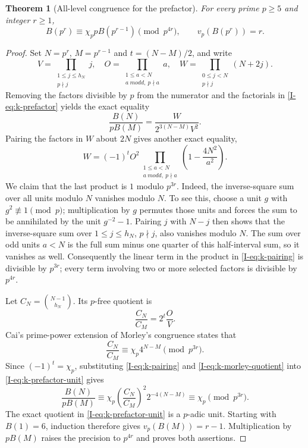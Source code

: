 \documentclass[11pt,letterpaper]{article}
\newtheorem{theorem}{Theorem}[section]
\numberwithin{equation}{section}
\begin{document}
\begin{theorem}[All-level congruence for the prefactor]
\label{I-thm:k-prefactor}
For every prime $p\ge5$ and integer $r\ge1$,
\begin{equation}\label{I-eq:k-prefactor-congruence}
 B(p^r)\equiv\chi_p pB(p^{r-1})\pmod{p^{4r}},
 \qquad v_p(B(p^r))=r.
\end{equation}
\end{theorem}
\begin{proof}
Set $N=p^r$, $M=p^{r-1}$ and $t=(N-M)/2$, and write
\[
 V=\prod_{\substack{1\le j\le h_N\\p\nmid j}}j,
 \quad O=\prod_{\substack{1\le a<N\\a\ modd,\ p\nmid a}}a,
 \quad W=\prod_{\substack{0\le j<N\\p\nmid j}}(N+2j).
\]
Removing the factors divisible by $p$ from the numerator and the
factorials in \eqref{I-eq:k-prefactor} yields the exact equality
\begin{equation}\label{I-eq:k-prefactor-unit}
 \frac{B(N)}{pB(M)}=\frac{W}{2^{3(N-M)}V^2}.
\end{equation}
Pairing the factors in $W$ about $2N$ gives another exact equality,
\begin{equation}\label{I-eq:k-pairing}
 W=(-1)^t O^2
 \prod_{\substack{1\le a<N\\a\ modd,\ p\nmid a}}
       \left(1-\frac{4N^2}{a^2}\right).
\end{equation}
We claim that the last product is $1$ modulo $p^{3r}$.
Indeed, the inverse-square sum over all units modulo $N$ vanishes
modulo $N$. To see this, choose a unit $g$ with $g^2\not\equiv1\pmod p$;
multiplication by $g$ permutes those units and forces the sum to be
annihilated by the unit $g^{-2}-1$. Pairing $j$ with $N-j$ then shows
that the inverse-square sum over $1\le j\le h_N$, $p\nmid j$, also
vanishes modulo $N$. The sum over odd units $a<N$ is the full sum
minus one quarter of this half-interval sum, so it vanishes as well.
Consequently the linear term in the product in \eqref{I-eq:k-pairing}
is divisible by $p^{3r}$; every term involving two or more selected
factors is divisible by $p^{4r}$.

Let $C_N=\binom{N-1}{h_N}$. Its $p$-free quotient is
\begin{equation}\label{I-eq:k-morley-quotient}
 \frac{C_N}{C_M}=2^t\frac{O}{V}.
\end{equation}
Cai's prime-power extension of Morley's congruence
\cite[Corollary~3]{I-Cai2002} states that
\[
 \frac{C_N}{C_M}\equiv\chi_p4^{N-M}\pmod{p^{3r}}.
\]
Since $(-1)^t=\chi_p$, substituting \eqref{I-eq:k-pairing} and
\eqref{I-eq:k-morley-quotient} into \eqref{I-eq:k-prefactor-unit} gives
\[
 \frac{B(N)}{pB(M)}
 \equiv\chi_p\left(\frac{C_N}{C_M}\right)^2
                  2^{-4(N-M)}
 \equiv\chi_p\pmod{p^{3r}}.
\]
The exact quotient in \eqref{I-eq:k-prefactor-unit} is a $p$-adic unit.
Starting with $B(1)=6$, induction therefore gives $v_p(B(M))=r-1$.
Multiplication by $pB(M)$ raises the precision to $p^{4r}$ and proves
both assertions.
\end{proof}
\end{document}
